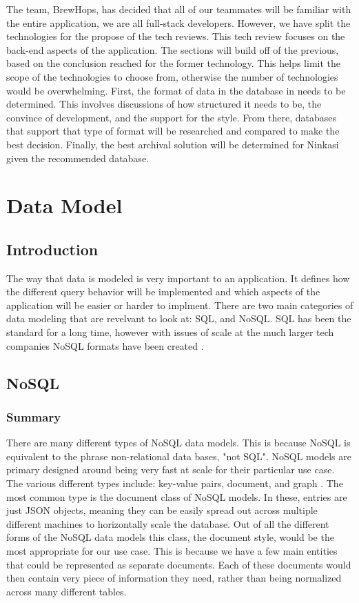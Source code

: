\documentclass[draftclsnofoot,onecolumn,journal,letterpaper,compsoc,10pt]{IEEEtran}
\begin{document}
The team, BrewHops, has decided that all of our teammates will be familiar with the entire application, we are all full-stack developers.  However, we have split the technologies for the propose of the tech reviews.  This tech review focuses on the back-end aspects of the application.  The sections will build off of the previous, based on the conclusion reached for the former technology.  This helps limit the scope of the technologies to choose from, otherwise the number of technologies would be overwhelming.  First, the format of data in the database in needs to be determined.  This involves discussions of how structured it needs to be, the convince of development, and the support for the style.  From there, databases that support that type of format will be researched and compared to make the best decision.  Finally, the best archival solution will be determined for Ninkasi given the recommended database.

\section{Data Model}

    \subsection{Introduction}
    
    The way that data is modeled is very important to an application.  It defines how the different query behavior will be implemented and which aspects of the application will be easier or harder to implment.  There are two main categories of data modeling that are revelvant to look at: SQL, and NoSQL.  SQL has been the standard for a long time, however with issues of scale at the much larger tech companies NoSQL formats have been created \cite{sqlizer}.
    
    \subsection{NoSQL}
    
        \subsubsection{Summary}
        
        There are many different types of NoSQL data models.  This is because NoSQL is equivalent to the phrase non-relational data bases, "not SQL".  NoSQL models are primary designed around being very fast at scale for their particular use case.  The various different types include: key-value pairs, document, and graph \cite{amazon_nosql}.  The most common type is the document class of NoSQL models.  In these, entries are just JSON objects, meaning they can be easily spread out across multiple different machines to horizontally scale the database.  Out of all the different forms of the NoSQL data models this class, the document style, would be the most appropriate for our use case.  This is because we have a few main entities that could be represented as separate documents.  Each of these documents would then contain very piece of information they need, rather than being normalized across many different tables.
        
\end{document}

